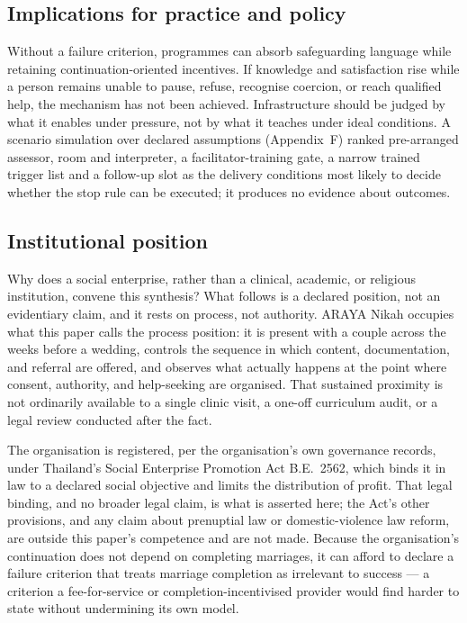 \documentclass[10pt,twocolumn]{article}
\begin{document}
\subsection{Implications for practice and policy}
Without a failure criterion, programmes can absorb safeguarding language while retaining continuation-oriented incentives. If knowledge and satisfaction rise while a person remains unable to pause, refuse, recognise coercion, or reach qualified help, the mechanism has not been achieved. Infrastructure should be judged by what it enables under pressure, not by what it teaches under ideal conditions. A scenario simulation over declared assumptions (Appendix~F) ranked pre-arranged assessor, room and interpreter, a facilitator-training gate, a narrow trained trigger list and a follow-up slot as the delivery conditions most likely to decide whether the stop rule can be executed; it produces no evidence about outcomes.

\subsection{Institutional position}
Why does a social enterprise, rather than a clinical, academic, or religious institution, convene this synthesis? What follows is a declared position, not an evidentiary claim, and it rests on process, not authority. ARAYA Nikah occupies what this paper calls the process position: it is present with a couple across the weeks before a wedding, controls the sequence in which content, documentation, and referral are offered, and observes what actually happens at the point where consent, authority, and help-seeking are organised. That sustained proximity is not ordinarily available to a single clinic visit, a one-off curriculum audit, or a legal review conducted after the fact.

The organisation is registered, per the organisation's own governance records, under Thailand's Social Enterprise Promotion Act B.E.~2562, which binds it in law to a declared social objective and limits the distribution of profit. That legal binding, and no broader legal claim, is what is asserted here; the Act's other provisions, and any claim about prenuptial law or domestic-violence law reform, are outside this paper's competence and are not made. Because the organisation's continuation does not depend on completing marriages, it can afford to declare a failure criterion that treats marriage completion as irrelevant to success --- a criterion a fee-for-service or completion-incentivised provider would find harder to state without undermining its own model.
\end{document}
